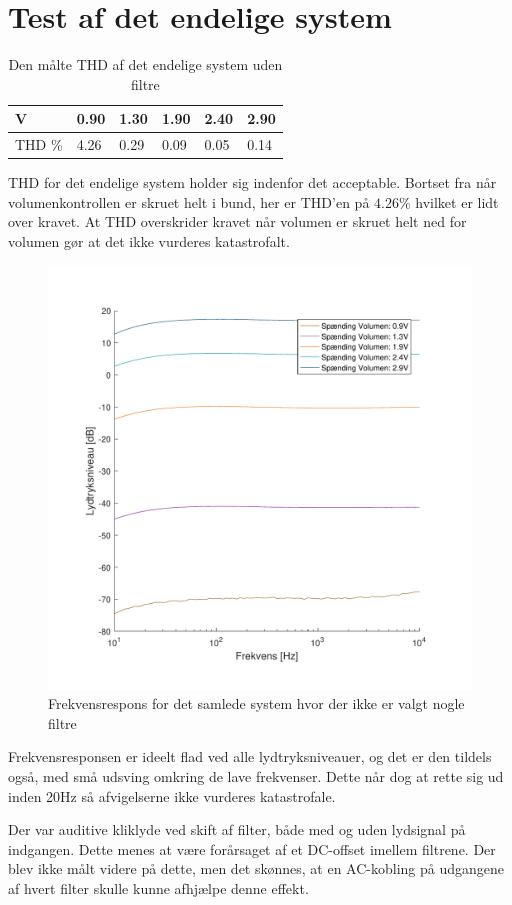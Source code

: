 \section{Test af det endelige system}
\label{TestAfDetSamledeSystem}


\begin{table}[H]
\centering
\begin{tabular}{|l|l|l|l|l|l|}
\hline
V & 0.90 & 1.30 & 1.90 & 2.40 & 2.90 \\ \hline
THD \% & 4.26 & 0.29 & 0.09 & 0.05 & 0.14 \\ \hline
\end{tabular}
\caption{Den målte THD af det endelige system uden filtre}
\label{tab:THDEndeligeSystem}
\end{table}
THD for det endelige system holder sig indenfor det acceptable. Bortset fra når volumenkontrollen er skruet helt i bund, her er THD'en på $4.26\%$ hvilket er lidt over kravet. At THD overskrider kravet når volumen er skruet helt ned for volumen gør at det ikke vurderes katastrofalt.
%

\begin{figure}[H]
	\centering
	\includegraphics[resolution=300,width=\textwidth]{Figure/FrekvensResponsEndeligeSystemUdenFiltre.pdf}
	\caption{Frekvensrespons for det samlede system hvor der ikke er valgt nogle filtre}
	\label{fig:FrekvensResponsEndeligeSystemUdenFiltre}
\end{figure}
\noindent
%
Frekvensresponsen er ideelt flad ved alle lydtryksniveauer, og det er den tildels også, med små udsving omkring de lave frekvenser. Dette når dog at rette sig ud inden 20Hz så afvigelserne ikke vurderes katastrofale.

Der var auditive kliklyde ved skift af filter, både med og uden lydsignal på indgangen. Dette menes at være forårsaget af et DC-offset imellem filtrene. Der blev ikke målt videre på dette, men det skønnes, at en AC-kobling på udgangene af hvert filter skulle kunne afhjælpe denne effekt.
